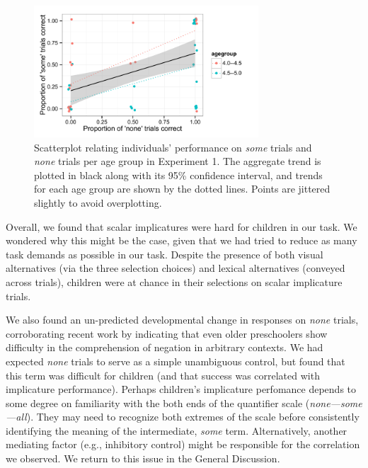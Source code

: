 \documentclass[10pt,letterpaper]{article}
\begin{document}
\begin{figure}[h] 
  \begin{center} 
    \includegraphics[width=3.3in]{figures/implicatures_adhocScalar_scatterplot.pdf} 
    \caption{\label{fig:expt1scatterplot} Scatterplot relating individuals' performance on \emph{some} trials and \emph{none} trials per age group in Experiment 1. The aggregate trend is plotted in black along with its 95\% confidence interval, and trends for each age group are shown by the dotted lines. Points are jittered slightly to avoid overplotting.}
    \end{center} 
\end{figure}


Overall, we found that scalar implicatures were hard for children in our task. We wondered why this might be the case, given that we had tried to reduce as many task demands as possible in our task. Despite the presence of both visual alternatives (via the three selection choices) and lexical alternatives (conveyed across trials), children were at chance in their selections on scalar implicature trials. 

We also found an un-predicted developmental change in responses on \emph{none} trials, corroborating recent work by \cite{nordmeyer2014} indicating that even older preschoolers show difficulty in the comprehension of negation in arbitrary contexts. We had expected \emph{none} trials to serve as a simple unambiguous control, but found that this term was difficult for children (and that success was correlated with implicature performance). Perhaps children's implicature perfomance depends to some degree on familiarity with the both ends of the quantifier scale (\emph{none---some---all}). They may need to recognize both extremes of the scale before consistently identifying the meaning of the intermediate, \emph{some} term. Alternatively, another mediating factor (e.g., inhibitory control) might be responsible for the correlation we observed. We return to this issue in the General Discussion.
\end{document}
